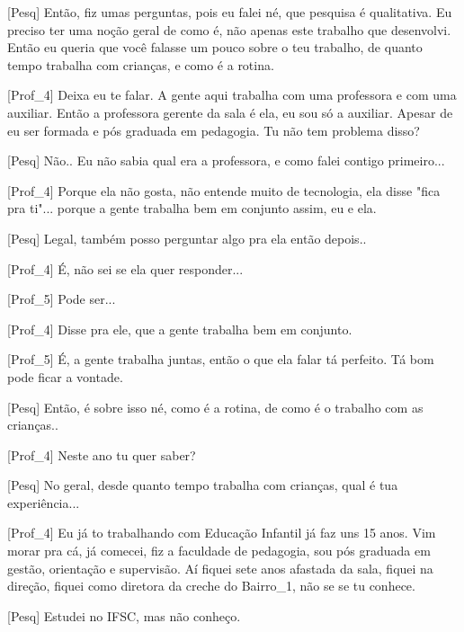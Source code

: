 [Pesq] Então, fiz umas perguntas, pois eu falei né, que pesquisa é qualitativa. Eu preciso ter uma noção geral de como é, não apenas este trabalho que desenvolvi. Então eu queria que você falasse um pouco sobre o teu trabalho, de quanto tempo trabalha com crianças, e como é a rotina.

[Prof\_4] Deixa eu te falar. A gente aqui trabalha com uma professora e com uma auxiliar. Então a professora gerente da sala é ela, eu sou só a auxiliar. Apesar de eu ser formada e pós graduada em pedagogia. Tu não tem problema disso?

[Pesq] Não.. Eu não sabia qual era a professora, e como falei contigo primeiro...

[Prof\_4] Porque ela não gosta, não entende muito de tecnologia, ela disse "fica pra ti"... porque a gente trabalha bem em conjunto assim, eu e ela.

[Pesq] Legal, também posso perguntar algo pra ela então depois..

[Prof\_4] É, não sei se ela quer responder...

[Prof\_5] Pode ser...

[Prof\_4] Disse pra ele, que a gente trabalha bem em conjunto.

[Prof\_5] É, a gente trabalha juntas, então o que ela falar tá perfeito. Tá bom pode ficar a vontade.

[Pesq] Então, é sobre isso né, como é a rotina, de como é o trabalho com as crianças.. 

[Prof\_4] Neste ano tu quer saber?

[Pesq] No geral, desde quanto tempo trabalha com crianças, qual é tua experiência...

[Prof\_4] Eu já to trabalhando com Educação Infantil já faz uns 15 anos. Vim morar pra cá, já comecei, fiz a faculdade de pedagogia, sou pós graduada em gestão, orientação e supervisão. Aí fiquei sete anos afastada da sala, fiquei na direção, fiquei como diretora da creche do Bairro\_1, não se se tu conhece. 

[Pesq] Estudei no IFSC, mas não conheço.

